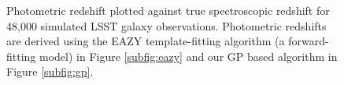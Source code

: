 \documentclass[prd,nofootbib,floatfix,11pt,tightenlines]{revtex4}
\begin{document}
\begin{figure}[th]
\caption{
Photometric redshift plotted
against true spectroscopic redshift for 48,000 simulated LSST galaxy
observations.  Photometric redshifts are derived using the
EAZY template-fitting
algorithm (a forward-fitting model) in Figure \ref{subfig:eazy} and
our GP based algorithm in Figure \ref{subfig:gp}.
}
\label{fig:scatter}
\end{figure}
\end{document}
